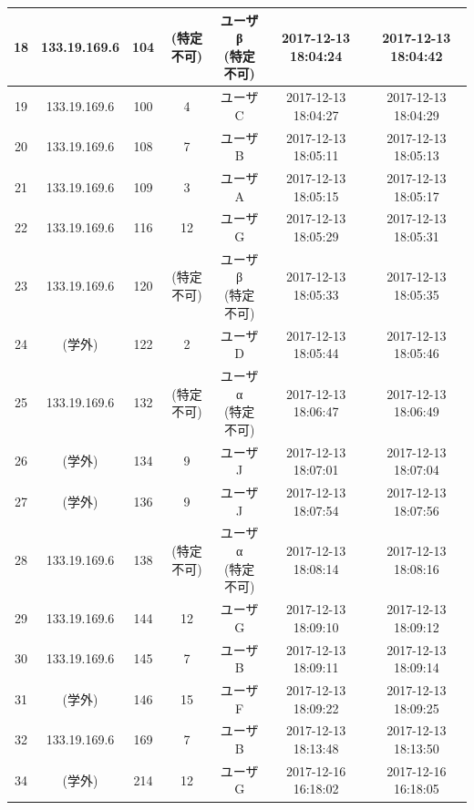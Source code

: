 \documentclass[10pt, a4paper]{jreport}
\begin{document}
\begin{table}[H]
\begin{center}
{\begin{tabular}{ | c | c | c | c | c | c | c | }
18 & 133.19.169.6 & 104 & (特定不可) & \shortstack{ユーザβ\\(特定不可)} & 2017-12-13 18:04:24 & 2017-12-13 18:04:42 \\ \hline
19 & 133.19.169.6 & 100 & 4 & ユーザC & 2017-12-13 18:04:27 & 2017-12-13 18:04:29 \\ \hline
20 & 133.19.169.6 & 108 & 7 & ユーザB & 2017-12-13 18:05:11 & 2017-12-13 18:05:13 \\ \hline
21 & 133.19.169.6 & 109 & 3 & ユーザA & 2017-12-13 18:05:15 & 2017-12-13 18:05:17 \\ \hline
22 & 133.19.169.6 & 116 & 12 & ユーザG & 2017-12-13 18:05:29 & 2017-12-13 18:05:31 \\ \hline
23 & 133.19.169.6 & 120 & (特定不可) & \shortstack{ユーザβ\\(特定不可)} & 2017-12-13 18:05:33 & 2017-12-13 18:05:35 \\ \hline
24 & (学外) & 122 & 2 & ユーザD & 2017-12-13 18:05:44 & 2017-12-13 18:05:46 \\ \hline
25 & 133.19.169.6 & 132 & (特定不可) & \shortstack{ユーザα\\(特定不可)} & 2017-12-13 18:06:47 & 2017-12-13 18:06:49 \\ \hline
26 & (学外) & 134 & 9 & ユーザJ & 2017-12-13 18:07:01 & 2017-12-13 18:07:04 \\ \hline
27 & (学外) & 136 & 9 & ユーザJ & 2017-12-13 18:07:54 & 2017-12-13 18:07:56 \\ \hline
28 & 133.19.169.6 & 138 & (特定不可) & \shortstack{ユーザα\\(特定不可)} & 2017-12-13 18:08:14 & 2017-12-13 18:08:16 \\ \hline
29 & 133.19.169.6 & 144 & 12 & ユーザG & 2017-12-13 18:09:10 & 2017-12-13 18:09:12 \\ \hline
30 & 133.19.169.6 & 145 & 7 & ユーザB & 2017-12-13 18:09:11 & 2017-12-13 18:09:14 \\ \hline
31 & (学外) & 146 & 15 & ユーザF & 2017-12-13 18:09:22 & 2017-12-13 18:09:25 \\ \hline
32 & 133.19.169.6 & 169 & 7 & ユーザB & 2017-12-13 18:13:48 & 2017-12-13 18:13:50 \\ \hline
34 & (学外) & 214 & 12 & ユーザG & 2017-12-16 16:18:02 & 2017-12-16 16:18:05 \\ \hline

			\end{tabular}
		}
	\end{center}
\end{table}
\end{document}
